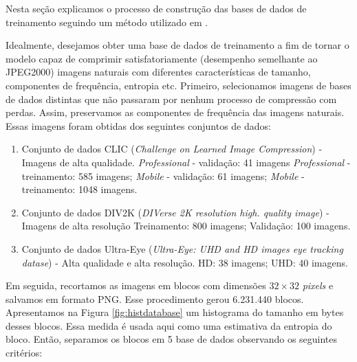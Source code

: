 Nesta seção explicamos o processo de construção das bases de dados de treinamento seguindo um método utilizado em \cite{DeliverableJuly}.


Idealmente, desejamos obter uma base de dados de treinamento a fim de tornar o modelo capaz de comprimir satisfatoriamente (desempenho semelhante ao JPEG2000) imagens naturais com diferentes características de tamanho, componentes de frequência, entropia etc. Primeiro, selecionamos imagens de bases de dados distintas que não passaram por nenhum processo de compressão com perdas. Assim, preservamos as componentes de frequência das imagens naturais. Essas imagens foram obtidas dos seguintes conjuntos de dados:

\begin{enumerate}
	\item Conjunto de dados CLIC \cite{bib:clic} (\textit{Challenge on Learned Image Compression}) - Imagens de alta qualidade.
	\subitem \textit{Professional} - validação: 41 imagens
	\subitem \textit{Professional} - treinamento: 585 imagens;
	\subitem \textit{Mobile} - validação: 61 imagens;
	\subitem \textit{Mobile} - treinamento: 1048 imagens.
	\item Conjunto de dados DIV2K \cite{bib:div2k} (\textit{DIVerse 2K resolution high.
		quality image}) - Imagens de alta resolução
	\subitem Treinamento: 800 imagens;
	\subitem Validação: 100 imagens.
	\item Conjunto de dados Ultra-Eye \cite{bib:ultraeye} (\textit{Ultra-Eye: UHD and HD images eye tracking datase}) - Alta qualidade e alta resolução.
	\subitem HD: 38 imagens;
	\subitem UHD: 40 imagens.
\end{enumerate}


Em seguida, recortamos as imagens em blocos com dimensões $32 \times 32$ \textit{pixels} e salvamos em formato PNG. Esse procedimento gerou 6.231.440 blocos. Apresentamos na Figura \ref{fig:histdatabase} um histograma do tamanho em bytes desses blocos. Essa medida é usada aqui como uma estimativa da entropia do bloco. Então, separamos os blocos em 5 base de dados observando os seguintes critérios:


